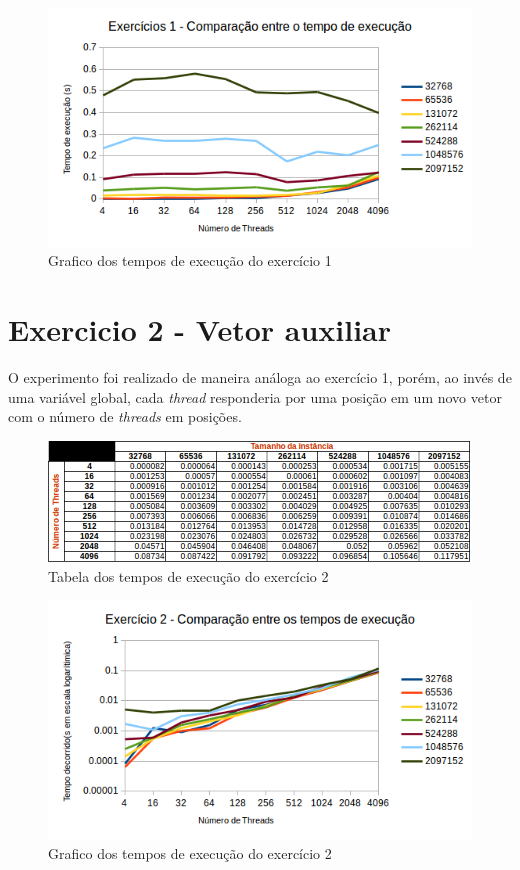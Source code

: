 \documentclass[a4paper, fontsize=12pt, parskip=half]{scrartcl}
\theoremstyle{mytheor}
\begin{document}
\begin{figure}[htb!]
	\centering
	\includegraphics[width=1\linewidth]{gfx/1aQ_g}
	\caption{Grafico dos tempos de execução do exercício 1}
	\label{fig:1aq_g}
\end{figure}

\section{Exercicio 2 - Vetor auxiliar}
O experimento foi realizado de maneira análoga ao exercício 1, porém, ao invés de uma variável global, cada \textit{thread} responderia por uma posição em um novo vetor com o número de \textit{threads} em posições.
\begin{figure}[htb!]
	\centering
	\includegraphics[width=1\linewidth]{gfx/2aQ}
	\caption{Tabela dos tempos de execução do exercício 2}
	\label{fig:2aq}
\end{figure}

\begin{figure}[htb!]
	\centering
	\includegraphics[width=1\linewidth]{gfx/2aQ_g}
	\caption{Grafico dos tempos de execução do exercício 2}
	\label{fig:2aq_g}
\end{figure}
\end{document}
